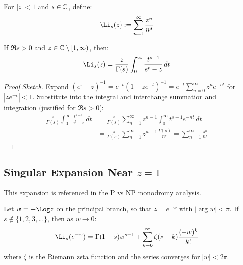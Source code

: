 \begin{definition}[Polylogarithm]\label{def:polylog}
For $|z| < 1$ and $s \in \mathbb{C}$, define:
\begin{equation}
\Li_s(z) := \sum_{n=1}^{\infty} \frac{z^n}{n^s}
\end{equation}
\end{definition}

\begin{proposition}\label{prop:polylog-integral}
If $\Re s > 0$ and $z \in \mathbb{C} \setminus [1, \infty)$, then:
\begin{equation}
\Li_s(z) = \frac{z}{\Gamma(s)} \int_0^{\infty} \frac{t^{s-1}}{e^t - z} \, dt
\end{equation}
\end{proposition}

\begin{proof}[Proof Sketch]
Expand $(e^t - z)^{-1} = e^{-t} (1 - z e^{-t})^{-1} = e^{-t} \sum_{n=0}^{\infty} z^n e^{-nt}$ for $|z e^{-t}| < 1$. Substitute into the integral and interchange summation and integration (justified for $\Re s > 0$):
\begin{align}
\frac{z}{\Gamma(s)} \int_0^{\infty} \frac{t^{s-1}}{e^t - z} \, dt &= \frac{z}{\Gamma(s)} \sum_{n=1}^{\infty} z^{n-1} \int_0^{\infty} t^{s-1} e^{-nt} \, dt \\
&= \frac{z}{\Gamma(s)} \sum_{n=1}^{\infty} z^{n-1} \frac{\Gamma(s)}{n^s} = \sum_{n=1}^{\infty} \frac{z^n}{n^s}
\end{align}
\end{proof}

\subsection{Singular Expansion Near $z = 1$}

This expansion is referenced in the P vs NP monodromy analysis.

\begin{theorem}[Singular Expansion Near $z = 1$]\label{thm:Li-expansion}
Let $w = -\Log z$ on the principal branch, so that $z = e^{-w}$ with $|\arg w| < \pi$. If $s \notin \{1, 2, 3, \ldots\}$, then as $w \to 0$:
\begin{equation}
\Li_s(e^{-w}) = \Gamma(1-s) w^{s-1} + \sum_{k=0}^{\infty} \zeta(s-k) \frac{(-w)^k}{k!}
\end{equation}
where $\zeta$ is the Riemann zeta function and the series converges for $|w| < 2\pi$.
\end{theorem}


